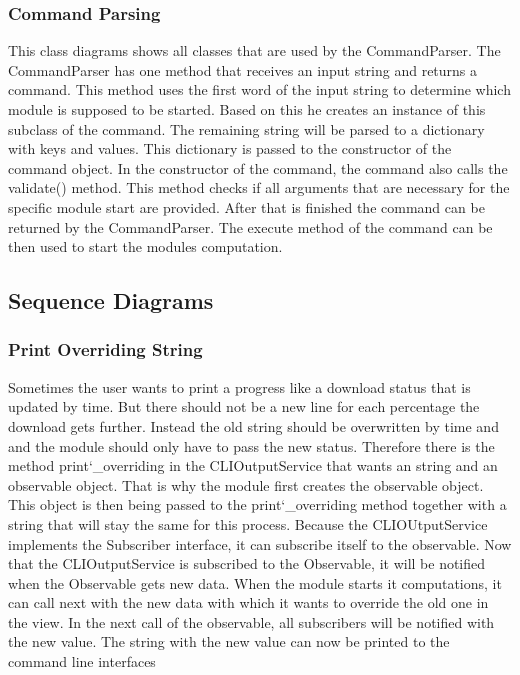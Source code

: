 \documentclass[parskip=full]{scrartcl}
\begin{document}
\subsubsection{Command Parsing}

This class diagrams shows all classes that are used by the CommandParser.
The CommandParser has one method that receives an input string and returns a command.
This method uses the first word of the input string to determine which module is supposed to be started.
Based on this he creates an instance of this subclass of the command.
The remaining string will be parsed to a dictionary with keys and values.
This dictionary is passed to the constructor of the command object.
In the constructor of the command, the command also calls the validate() method.
This method checks if all arguments that are necessary for the specific module start are provided.
After that is finished the command can be returned by the CommandParser.
The execute method of the command can be then used to start the modules computation.



\subsection{Sequence Diagrams}

\subsubsection{Print Overriding String}

Sometimes the user wants to print a progress like a download status that is updated by time.
But there should not be a new line for each percentage the download gets further.
Instead the old string should be overwritten by time and and the module should only have to pass the new status.
Therefore there is the method print\char`_overriding in the CLIOutputService that wants an string and an observable object.
That is why the module first creates the observable object.
This object is then being passed to the print\char`_overriding method together with a string that will stay the same for this process.
Because the CLIOUtputService implements the Subscriber interface, it can subscribe itself to the observable.
Now that the CLIOutputService is subscribed to the Observable, it will be notified when the Observable gets new data.
When the module starts it computations, it can call next with the new data with which it wants to override the old one in the view.
In the next call of the observable, all subscribers will be notified with the new value.
The string with the new value can now be printed to the command line interfaces
\end{document}

